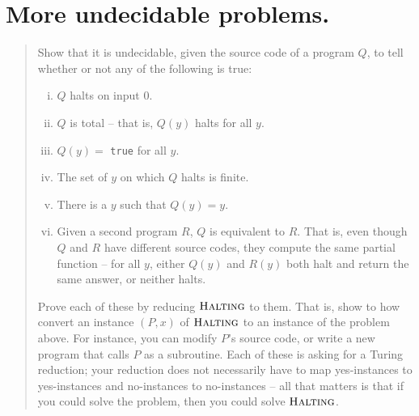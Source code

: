 

\maketitle
\thispagestyle{firststyle}
\vspace{-2.0cm}
\section{More undecidable problems. }
\begin{quote}
    Show that it is undecidable, given the source code of a program $Q$, to tell whether or not any of the following is true:
    \begin{enumerate}[(i)]
      \item $Q$ halts on input 0.
      \item $Q$ is total -- that is, $Q(y)$ halts for all $y$.
      \item $Q(y)=$ {\tt true} for all $y$.
      \item The set of $y$ on which $Q$ halts is finite.
      \item There is a $y$ such that $Q(y)= y$.
      \item Given a second program $R$, $Q$ is equivalent to $R$.
      That is, even though $Q$ and $R$ have different source codes,
      they compute the same partial function --
      for all $y$, either $Q(y)$ and $R(y)$ both halt and return the same answer, or neither halts.
    \end{enumerate}
    Prove each of these by reducing $\textsc{Halting}$ to them.
    That is, show to how convert an instance $(P, x)$ of $\textsc{Halting}$ to an instance of the problem above.
    For instance, you can modify $P$'s source code,
    or write a new program that calls $P$ as a subroutine.
    Each of these is asking for a Turing reduction;
    your reduction does not necessarily have to map yes-instances to yes-instances and no-instances to no-instances --
    all that matters is that if you could solve the problem,
    then you could solve $\textsc{Halting}$.
\end{quote}


